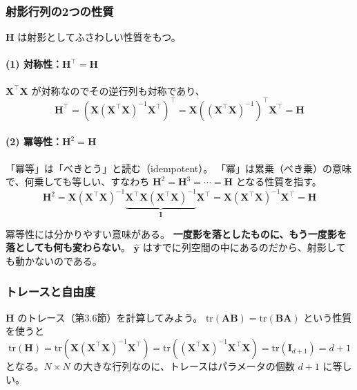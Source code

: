 \subsubsection{射影行列の2つの性質}

$\bm{H}$ は射影としてふさわしい性質をもつ。

\paragraph{(1) 対称性：$\bm{H}^\top = \bm{H}$}
$\bm{X}^\top\bm{X}$ が対称なのでその逆行列も対称であり、
\begin{equation*}
  \bm{H}^\top
   = \left( \bm{X}(\bm{X}^\top\bm{X})^{-1}\bm{X}^\top \right)^\top
   = \bm{X}\left( (\bm{X}^\top\bm{X})^{-1} \right)^\top \bm{X}^\top
   = \bm{H}
\end{equation*}

\paragraph{(2) 冪等性：$\bm{H}^2 = \bm{H}$}
「冪等」は「べきとう」と読む（idempotent）。
「冪」は累乗（べき乗）の意味で、何乗しても等しい、すなわち
$\bm{H}^2 = \bm{H}^3 = \cdots = \bm{H}$ となる性質を指す。
\begin{equation*}
  \bm{H}^2
   = \bm{X}(\bm{X}^\top\bm{X})^{-1}\underbrace{\bm{X}^\top\bm{X}(\bm{X}^\top\bm{X})^{-1}}_{\bm{I}}\bm{X}^\top
   = \bm{X}(\bm{X}^\top\bm{X})^{-1}\bm{X}^\top = \bm{H}
\end{equation*}

冪等性には分かりやすい意味がある。
\textbf{一度影を落としたものに、もう一度影を落としても何も変わらない}。
$\hat{\bm{y}}$ はすでに列空間の中にあるのだから、射影しても動かないのである。

\subsubsection{トレースと自由度}

$\bm{H}$ のトレース（第3.6節）を計算してみよう。
$\mathrm{tr}(\bm{A}\bm{B}) = \mathrm{tr}(\bm{B}\bm{A})$ という性質を使うと
\begin{equation}
  \mathrm{tr}(\bm{H})
   = \mathrm{tr}\left( \bm{X}(\bm{X}^\top\bm{X})^{-1}\bm{X}^\top \right)
   = \mathrm{tr}\left( (\bm{X}^\top\bm{X})^{-1}\bm{X}^\top\bm{X} \right)
   = \mathrm{tr}(\bm{I}_{d+1}) = d+1
  \label{eq:hat-trace}
\end{equation}
となる。$N \times N$ の大きな行列なのに、トレースはパラメータの個数 $d+1$ に等しい。

